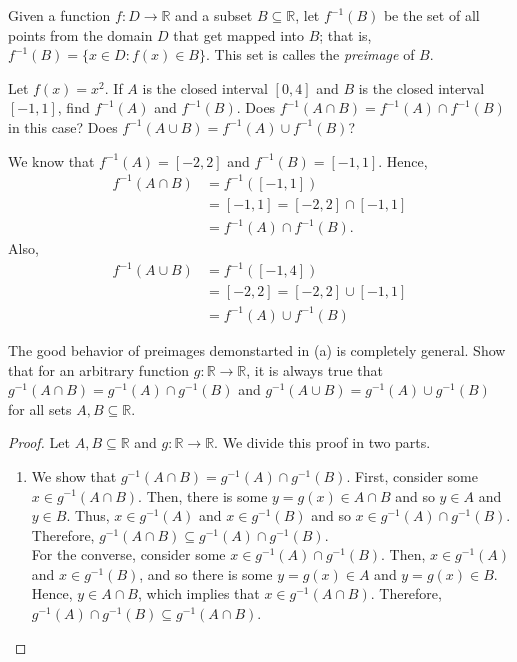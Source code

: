 \documentclass[12pt]{article}
\newcommand{\R}{\mathbb{R}}
\newenvironment{problem}[2][Problem]{\begin{trivlist}
		\item[\hskip \labelsep {\bfseries #1}\hskip \labelsep {\bfseries #2.}]}{\end{trivlist}}
\newenvironment{solution}[2][Solution]{\begin{trivlist}
		\item[\hskip \labelsep {\bfseries #1}\hskip \labelsep {\bfseries #2.}]}{\end{trivlist}}
\begin{document}
	\begin{problem}{1.2.9}
		Given a function $f:D\to \R$ and a subset $B\subseteq \R$, let $f^{-1}(B)$ be the set of all points from the domain $D$ that get mapped into $B$; that is, $f^{-1}(B) = \{x\in D:f(x)\in B\}$. This set is calles the \textit{preimage} of $B$.
		\begin{enumerate}[label=(\alph*)]
			\item Let $f(x) = x^{2}$. If $A$ is the closed interval $[0,4]$ and $B$ is the closed interval $[-1,1]$, find $f^{-1}(A)$ and $f^{-1}(B)$. Does $f^{-1}(A\cap B) = f^{-1}(A)\cap f^{-1}(B)$ in this case? Does $f^{-1}(A\cup B) = f^{-1}(A)\cup f^{-1}(B)$?
			\begin{solution}{a}
				We know that $f^{-1}(A) = [-2,2]$ and $f^{-1}(B) = [-1,1]$. Hence,  
				\begin{align*}
					f^{-1} (A\cap B) &= f^{-1} ([-1,1]) \\
					&= [-1,1] = [-2,2]\cap [-1,1] \\
					&= f^{-1}(A)\cap f^{-1}(B).
				\end{align*}
			Also,
				\begin{align*}
					f^{-1}(A\cup B) &= f^{-1} ([-1,4])\\
					&= [-2,2] = [-2,2]\cup [-1,1]\\
					&= f^{-1}(A)\cup f^{-1}(B)
				\end{align*}
			\end{solution}
			\item The good behavior of preimages demonstarted in (a) is completely general. Show that for an arbitrary function $g:\R \to \R$, it is always true that $g^{-1}(A\cap B) = g^{-1}(A)\cap g^{-1}(B)$ and $g^{-1}(A\cup B) = g^{-1}(A)\cup g^{-1}(B)$ for all sets $A,B\subseteq \R$.
			\begin{proof}
				Let $A,B\subseteq \R$ and $g:\R\to \R$. We divide this proof in two parts.
				\begin{enumerate}[label=(\alph*)]
					\item We show that $g^{-1}(A\cap B) = g^{-1}(A)\cap g^{-1}(B)$. First, consider some $x\in g^{-1}(A\cap B)$. Then, there is some $y = g(x) \in A\cap B$ and so $y \in A$ and $y\in B$. Thus, $x\in g^{-1}(A)$ and $x\in g^{-1}(B)$ and so $x\in g^{-1}(A)\cap g^{-1}(B)$. Therefore, $g^{-1}(A\cap B) \subseteq g^{-1}(A)\cap g^{-1}(B)$.\\
					
					For the converse, consider some $x\in g^{-1}(A)\cap g^{-1}(B)$. Then, $x\in g^{-1}(A)$ and $x\in g^{-1}(B)$, and so there is some $y=g(x)\in A$ and $y=g(x) \in B$. Hence, $y\in A\cap B$, which implies that $x\in g^{-1}(A\cap B)$. Therefore, $g^{-1}(A)\cap g^{-1}(B)\subseteq g^{-1}(A\cap B)$.\\
					

\end{enumerate}
\end{proof}
\end{enumerate}
\end{problem}
\end{document}
